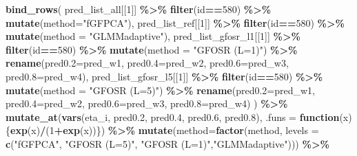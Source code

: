 \documentclass[
]{article}
\newenvironment{Shaded}{\begin{snugshade}}{\end{snugshade}}
\newcommand{\AttributeTok}[1]{\textcolor[rgb]{0.13,0.29,0.53}{#1}}
\newcommand{\ControlFlowTok}[1]{\textcolor[rgb]{0.13,0.29,0.53}{\textbf{#1}}}
\newcommand{\DecValTok}[1]{\textcolor[rgb]{0.00,0.00,0.81}{#1}}
\newcommand{\FloatTok}[1]{\textcolor[rgb]{0.00,0.00,0.81}{#1}}
\newcommand{\FunctionTok}[1]{\textcolor[rgb]{0.13,0.29,0.53}{\textbf{#1}}}
\newcommand{\NormalTok}[1]{#1}
\newcommand{\SpecialCharTok}[1]{\textcolor[rgb]{0.81,0.36,0.00}{\textbf{#1}}}
\newcommand{\StringTok}[1]{\textcolor[rgb]{0.31,0.60,0.02}{#1}}
\begin{document}
\begin{Shaded}
\begin{Highlighting}[]
\FunctionTok{bind\_rows}\NormalTok{(}
\NormalTok{  pred\_list\_all[[}\DecValTok{1}\NormalTok{]] }\SpecialCharTok{\%\textgreater{}\%} \FunctionTok{filter}\NormalTok{(id}\SpecialCharTok{==}\DecValTok{580}\NormalTok{) }\SpecialCharTok{\%\textgreater{}\%} 
    \FunctionTok{mutate}\NormalTok{(}\AttributeTok{method=}\StringTok{"fGFPCA"}\NormalTok{),}
\NormalTok{  pred\_list\_ref[[}\DecValTok{1}\NormalTok{]] }\SpecialCharTok{\%\textgreater{}\%} \FunctionTok{filter}\NormalTok{(id}\SpecialCharTok{==}\DecValTok{580}\NormalTok{) }\SpecialCharTok{\%\textgreater{}\%}
    \FunctionTok{mutate}\NormalTok{(}\AttributeTok{method =} \StringTok{"GLMMadaptive"}\NormalTok{),}
\NormalTok{  pred\_list\_gfosr\_l1[[}\DecValTok{1}\NormalTok{]] }\SpecialCharTok{\%\textgreater{}\%} \FunctionTok{filter}\NormalTok{(id}\SpecialCharTok{==}\DecValTok{580}\NormalTok{) }\SpecialCharTok{\%\textgreater{}\%}
    \FunctionTok{mutate}\NormalTok{(}\AttributeTok{method =} \StringTok{"GFOSR (L=1)"}\NormalTok{) }\SpecialCharTok{\%\textgreater{}\%}
    \FunctionTok{rename}\NormalTok{(}\AttributeTok{pred0.2=}\NormalTok{pred\_w1, }\AttributeTok{pred0.4=}\NormalTok{pred\_w2, }\AttributeTok{pred0.6=}\NormalTok{pred\_w3, }\AttributeTok{pred0.8=}\NormalTok{pred\_w4),}
\NormalTok{  pred\_list\_gfosr\_l5[[}\DecValTok{1}\NormalTok{]] }\SpecialCharTok{\%\textgreater{}\%} \FunctionTok{filter}\NormalTok{(id}\SpecialCharTok{==}\DecValTok{580}\NormalTok{) }\SpecialCharTok{\%\textgreater{}\%}
    \FunctionTok{mutate}\NormalTok{(}\AttributeTok{method =} \StringTok{"GFOSR (L=5)"}\NormalTok{) }\SpecialCharTok{\%\textgreater{}\%}
    \FunctionTok{rename}\NormalTok{(}\AttributeTok{pred0.2=}\NormalTok{pred\_w1, }\AttributeTok{pred0.4=}\NormalTok{pred\_w2, }\AttributeTok{pred0.6=}\NormalTok{pred\_w3, }\AttributeTok{pred0.8=}\NormalTok{pred\_w4)}
\NormalTok{) }\SpecialCharTok{\%\textgreater{}\%} \FunctionTok{mutate\_at}\NormalTok{(}\FunctionTok{vars}\NormalTok{(eta\_i, pred0}\FloatTok{.2}\NormalTok{, pred0}\FloatTok{.4}\NormalTok{, pred0}\FloatTok{.6}\NormalTok{, pred0}\FloatTok{.8}\NormalTok{), }
                \AttributeTok{.funs =} \ControlFlowTok{function}\NormalTok{(x)\{}\FunctionTok{exp}\NormalTok{(x)}\SpecialCharTok{/}\NormalTok{(}\DecValTok{1}\SpecialCharTok{+}\FunctionTok{exp}\NormalTok{(x))\}) }\SpecialCharTok{\%\textgreater{}\%}
  \FunctionTok{mutate}\NormalTok{(}\AttributeTok{method=}\FunctionTok{factor}\NormalTok{(method, }
         \AttributeTok{levels =} \FunctionTok{c}\NormalTok{(}\StringTok{"fGFPCA"}\NormalTok{, }\StringTok{"GFOSR (L=5)"}\NormalTok{, }\StringTok{"GFOSR (L=1)"}\NormalTok{,}\StringTok{"GLMMadaptive"}\NormalTok{))) }\SpecialCharTok{\%\textgreater{}\%}

\end{Highlighting}
\end{Shaded}
\end{document}
